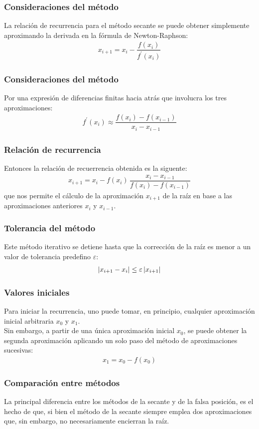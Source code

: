 \begin{frame}
\frametitle{Consideraciones del método}
La relación de recurrencia para el método secante se puede obtener simplemente aproximando la derivada en la fórmula de Newton-Raphson:
\begin{align*}
x_{i+1} = x_{i} - \dfrac{f(x_{i})}{f^{\prime}(x_{i})}
\end{align*}
\end{frame}
\begin{frame}
\frametitle{Consideraciones del método}
Por una expresión de diferencias finitas hacia atrás que involucra los tres aproximaciones:
\begin{align*}
f^{\prime}(x_{i}) \approx \dfrac{f(x_{i}) - f(x_{i-1})}{x_{i} - x_{i-1}}
\end{align*}
\end{frame}
\begin{frame}
\frametitle{Relación de recurrencia}
Entonces la relación de recuerrencia obtenida es la siguente:
\begin{align*}
x_{i+1} = x_{i} - f(x_{i}) \, \dfrac{x_{i} - x_{i-1}}{f(x_{i}) - f(x_{i-1})}
\end{align*}
\pause
que nos permite el cálculo de la aproximación $x_{i+1}$ de la raíz en base a las aproximaciones anteriores
$x_{i}$ y $x_{i-1}$.
\end{frame}
\begin{frame}
\frametitle{Tolerancia del método}
Este método iterativo se detiene hasta que la corrección de la raíz es menor a un valor de tolerancia predefino $\varepsilon$:
\begin{align*}
\abs{x_{i+1} - x_{i}} \leq \varepsilon \, \abs{x_{i+1}}
\end{align*}
\end{frame}
\begin{frame}
\frametitle{Valores iniciales}
Para iniciar la recurrencia, uno puede tomar, en principio, cualquier aproximación inicial arbitraria $x_{0}$ y $x_{1}$.
\\
\bigskip
Sin embargo, a partir de una única aproximación inicial $x_{0}$, se puede obtener la segunda aproximación aplicando un solo paso del método de aproximaciones sucesivas:
\begin{align*}
x_{1} = x_{0} - f(x_{0})
\end{align*}
\end{frame}
\begin{frame}
\frametitle{Comparación entre métodos}
La principal diferencia entre los métodos de la secante y de la falsa posición, es el hecho de que, si bien el método de la secante siempre emplea dos aproximaciones que, sin embargo, no necesariamente encierran la raíz.
\end{frame}

